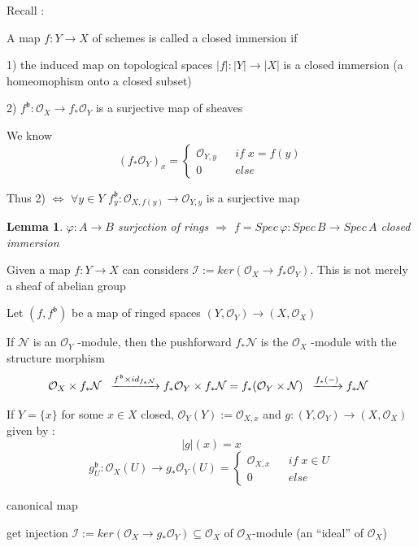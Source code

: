 \documentclass{article}
\newtheorem{lemma}[theorem]{Lemma}
\begin{document}
Recall : 

A map $f:Y\to X$ of schemes is called a closed immersion if
    
    1) the induced map on topological spaces $|f|:|Y|\to|X|$ is a closed immersion (a homeomophism onto a closed subset) 
    
    2) $f^{\mathfrak b}:{\mathcal{O}}_{X}\to f_{\ast}{\mathcal{O}}_{Y}$ is a surjective map of sheaves

We know 
$$ 
(f_\ast\mathcal O_Y)_x=\left\{
\begin{array}{rcl}
\mathcal O_{Y,y}       &      & if\;x=f(y) \\
0     &      & else
\end{array} \right. $$

Thus 2) $\Leftrightarrow$ $\forall y\in Y$ $f^{\mathfrak b}_y:{\mathcal{O}}_{X, f(y)}\to {\mathcal{O}}_{Y,y}$ is a surjective map

\begin{lemma}
    $\varphi:A\to B$ surjection of rings $\Rightarrow$ $f=Spec\,\varphi:Spec\,B\to Spec\,A$ closed immersion
\end{lemma}

Given a map $f:Y\to X$ can considers
$\mathcal I:= ker({\mathcal{O}}_{X}\to f_{\ast}{\mathcal{O}}_{Y})$. This is not merely a sheaf of abelian group

Let $(f,f^{\mathfrak b})$ be a map of ringed spaces $(Y,{\mathcal{O}}_{Y})\to(X,{\mathcal{O}}_{X})$ 

If $\mathcal N$ is an ${\mathcal{O}}_{Y}$ -module, then the pushforward $f_{\ast}{\mathcal{N}}$ is the ${\mathcal{O}}_{X}$ -module with the structure morphism
$$
{\cal O}_{X}\times f_{\ast}{\cal N}\;\;
\xrightarrow{f^{\mathfrak b}\times id_{f_\ast\mathcal N}}
f_\ast{\cal O}_{Y}\times f_{\ast}{\cal N}
=f_{\ast}({\cal O}_{Y}\times{\cal N})\;\;
\xrightarrow{f_{\ast}(-)}
f_{\ast}{\cal N}\;\; 
$$

If $Y=\{x\}$ for some $x\in X$ closed, $\mathcal O_Y(Y):=\mathcal O_{X,x}$ and $g:(Y,\mathcal O_Y)\to (X,\mathcal O_X)$ given by :
$$|g|(x)=x$$
$$ 
g_U^\mathfrak b : \mathcal O_X(U)\to g_\ast\mathcal O_Y(U)=\left\{
\begin{array}{rcl}
\mathcal O_{X,x}       &      & if\;x\in U \\
0     &      & else
\end{array} \right. $$

canonical map

get injection $\mathcal I:=ker(\mathcal O_X\to g_\ast\mathcal O_Y)\subseteq \mathcal O_X$ of $\mathcal O_X$-module (an ``ideal'' of $\mathcal O_X$)
\end{document}
